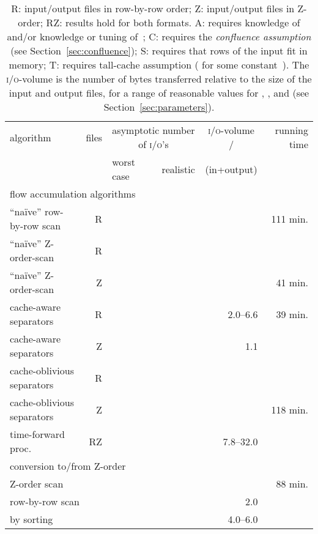 \documentclass[10pt,a4paper]{article}
\def\io{\textsc{i/o}\xspace}
\def\ios{\textsc{i/o}'s\xspace}
\begin{document}
\begin{table}
\def\arraystretch{1.25}
\begin{tabularx}{\hsize}{|Xr|lr|r|r|}
\hline
algorithm & files & \multicolumn{2}{c|}{asymptotic number of \ios} & \multicolumn{1}{c|}{\io-volume /} & running time\\
          & & worst case & realistic & \multicolumn{1}{c|}{(in+output)} & \multicolumn{1}{c|}{}\\
\hline\hline
\multicolumn{6}{|l|}{flow accumulation algorithms}\\
\hline
``na\"ive'' row-by-row scan & \textsf{R}                  &                            & { } &         & 111 min.\hphantom{*}\\
``na\"ive'' Z-order-scan & \textsf{R}     &                           & { } &         &     \\
``na\"ive'' Z-order-scan & \textsf{Z}        &                    & { } &         &  41 min.\hphantom{*}\\
cache-aware separators & \textsf{R}                   & \multicolumn{2}{c|}{{ }} & 2.0--6.6{ } &  39 min.\hphantom{*}\\
cache-aware separators & \textsf{Z}   & \multicolumn{2}{c|}{{ }} &     1.1{ }  & \\
cache-oblivious separators & \textsf{R}              & \multicolumn{2}{c|}{{ }}  & & \\
cache-oblivious separators & \textsf{Z}              & \multicolumn{2}{c|}{{ }}  & & 118 min.\hphantom{*}\\
\hline
time-forward proc.~\cite{terraflow,gridproblems,terrastream} & \textsf{RZ} & \multicolumn{2}{c|}{{ }}                    &   7.8--32.0{ } & \\
\hline\hline
\multicolumn{6}{|l|}{conversion to/from Z-order}\\
\hline
\multicolumn{2}{|l|}{Z-order scan} & \multicolumn{2}{c|}{{ }} &  & 88 min.\hphantom{*}\\
\multicolumn{2}{|l|}{row-by-row scan} & \multicolumn{2}{c|}{{ }} & 2.0\hphantom{ } & \\
\multicolumn{2}{|l|}{by sorting} & \multicolumn{2}{c|}{{ }} & 4.0--6.0{ } & \\
\hline
\end{tabularx}
\caption{\textsf{R}: input/output files in row-by-row order;\quad
\textsf{Z}: input/output files in Z-order;\quad
\textsc{RZ}: results hold for both formats.\quad
\textsf{A}: requires knowledge of  and/or knowledge or tuning of~;\quad
\textsf{C}: requires the \emph{confluence assumption} (see Section~\ref{sec:confluence});\quad
\textsf{S}: requires that  rows of the input fit in memory;\quad
\textsf{T}: requires tall-cache assumption ( for some constant~).\hfill\break
The \io-volume is the number of bytes transferred relative to the size of the input and output files, for a range of reasonable values for , , and  (see Section~\ref{sec:parameters}).}
\label{tab:results}
\end{table}
\end{document}

